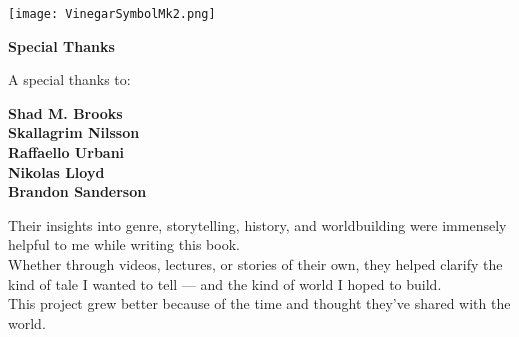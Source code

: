 \documentclass[12pt]{article}
\begin{document}


\newpage

\begin{titlepage}
\vspace*{\fill}
\begin{center}
\texttt{[image: VinegarSymbolMk2.png]}
\end{center}
\vspace*{\fill}
\end{titlepage}

\newpage

\begin{titlepage}
\vspace*{\fill}
\begin{center}
\textbf{\Large Special Thanks}
\vspace{2em}

\noindent
A special thanks to:

\vspace{1em}

\textbf{Shad M. Brooks} \\
\textbf{Skallagrim Nilsson}\\
\textbf{Raffaello Urbani} \\
\textbf{Nikolas Lloyd} \\
\textbf{Brandon Sanderson}

\vspace{1.5em}

Their insights into genre, storytelling, history, and worldbuilding were immensely helpful to me while writing this book. \\
Whether through videos, lectures, or stories of their own, they helped clarify the kind of tale I wanted to tell — and the kind of world I hoped to build. \\
This project grew better because of the time and thought they’ve shared with the world.

\end{center}
\vspace*{\fill}
\end{titlepage}

\newpage
\end{document}
